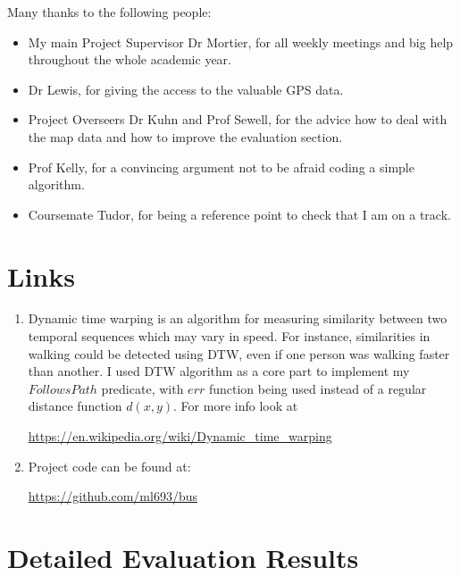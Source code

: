 \documentclass[12pt,a4paper,oneside,openright]{report}
\begin{document}
Many thanks to the following people:

\begin{itemize}

\item My main Project Supervisor Dr Mortier, for all weekly meetings and big help throughout
      the whole academic year.

\item Dr Lewis, for giving the access to the valuable GPS data.

\item Project Overseers Dr Kuhn and Prof Sewell, for the advice how to deal with the map data and
      how to improve the evaluation section.

\item Prof Kelly, for a convincing argument not to be afraid coding a simple algorithm.

\item Coursemate Tudor, for being a reference point to check that I am on a track.

\end{itemize}

\appendix

\chapter{Links}

\begin{enumerate}
\item Dynamic time warping is an algorithm for measuring similarity between
two temporal sequences which may vary in speed. For instance, similarities in
walking could be detected using DTW, even if one person was walking faster than
another. I used DTW algorithm as a core part to implement my $FollowsPath$
predicate, with $err$ function being used instead of a regular distance function 
$d(x, y)$.
For more info look at

\textcolor{blue}{\url{https://en.wikipedia.org/wiki/Dynamic_time_warping}}

\item Project code can be found at: 

\textcolor{blue}{\url{https://github.com/ml693/bus}}


\end{enumerate}

\chapter{Detailed Evaluation Results}
\end{document}
